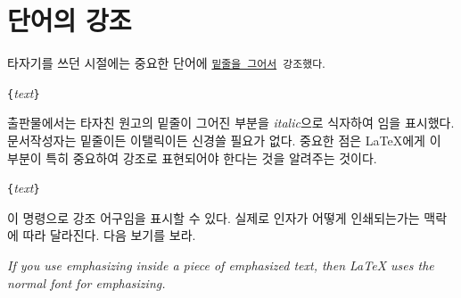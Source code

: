 \section{단어의 강조}

타자기를 쓰던 시절에는 중요한 단어에 \texttt{\underline{밑줄을 그어서} 강조했다}.
\begin{lscommand}
\verb|{|\emph{text}\verb|}|
\end{lscommand}
출판물에서는 타자친 원고의 밑줄이 그어진 부분을 \emph{italic}으로 식자하여 임을 표시했다.
문서작성자는 밑줄이든 이탤릭이든 신경쓸 필요가 없다. 중요한 점은 \LaTeX 에게 이 부분이 특히 중요하여 
강조로 표현되어야 한다는 것을 알려주는 것이다.
\begin{lscommand}
\verb|{|\emph{text}\verb|}|
\end{lscommand}
\noindent 이 명령으로 강조 어구임을 표시할 수 있다. 실제로 인자가 어떻게 인쇄되는가는 
맥락에 따라 달라진다. 다음 보기를 보라.

\begin{example}
\emph{If you use
  emphasizing inside a piece
  of emphasized text, then
  \LaTeX{} uses the
  \emph{normal} font for
  emphasizing.}
\end{example}

